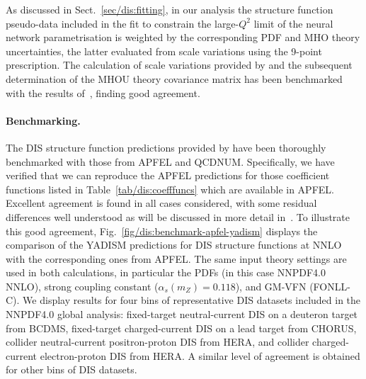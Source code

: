 As discussed in Sect.~\ref{sec/dis:fitting}, in our analysis the \yadism
structure function pseudo-data included in the fit to constrain the
large-$Q^2$ limit of the neural network parametrisation is weighted
by the corresponding PDF and MHO theory uncertainties, the latter
evaluated from scale variations using the 9-point prescription.
%
The calculation of scale variations provided by \yadism and the subsequent
determination of the MHOU theory covariance matrix has been benchmarked
with the results of~\cite{NNPDF:2019ubu}, finding good agreement.

\paragraph{Benchmarking.}
%
The DIS structure function predictions provided by \yadism
have been thoroughly benchmarked  with those from {\sc\small
  APFEL} and \textsc{\small QCDNUM}.
%
Specifically, we have verified that we can reproduce
the \textsc{\small APFEL} predictions for those coefficient functions listed
in Table~\ref{tab/dis:coefffuncs} which are available in \textsc{\small APFEL}.
%
Excellent agreement is found in all cases considered, with some residual
differences well understood as will be discussed in more detail in~\cite{yadism}.
%
To illustrate this good agreement,
Fig.~\ref{fig/dis:benchmark-apfel-yadism} displays
the comparison of the \textsc{\small YADISM} predictions for DIS structure functions at NNLO
with the corresponding ones from \textsc{\small APFEL}.
%
The same input theory settings are used in both calculations,
in particular the PDFs (in this case NNPDF4.0 NNLO), strong coupling constant ($\alpha_s(m_Z)=0.118$),
and GM-VFN (FONLL-C).
%
We display results for four bins of representative DIS datasets included
in the NNPDF4.0 global analysis: fixed-target neutral-current DIS on a deuteron target
from BCDMS, fixed-target charged-current DIS on a lead target
from CHORUS, collider neutral-current positron-proton DIS from HERA,
and collider charged-current electron-proton DIS from HERA.
%
A similar level of agreement is obtained for other bins
of DIS datasets.

